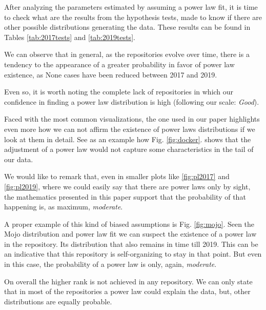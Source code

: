 \documentclass{article}
\begin{document}
After analyzing the parameters estimated by assuming a power law fit,
it is time to check what are 
the results from the hypothesis tests, made to know if there are other
possible distributions generating the data. These results can be found
in Tables \ref{tab:2017tests} and \ref{tab:2019tests}.

We can observe that in general, as the repositories evolve over time,
there is a tendency to the appearance of a greater probability in
favor of power law existence, as None cases have been reduced between
2017 and 2019.

Even so, it is worth noting the complete lack of repositories in which
our confidence in finding a power law distribution is high (following
our scale: \textit{Good}).

Faced with the most common visualizations, the one used in our paper
highlights even more how we can not affirm the existence of power laws
distributions if we look at them in detail. See as an example how
Fig. \ref{fig:docker}. shows that the adjustment of a power law would
not capture some characteristics in the tail of our data.

We would like to remark that, even in smaller plots like
\ref{fig:pl2017} and \ref{fig:pl2019}, where we could easily say that
there are power laws only by sight, the mathematics presented in this
paper support that the probability of that happening is, as maximum,
\textit{ moderate}.

A proper example of this kind of biased assumptions is
Fig. \ref{fig:mojo}. Seen the Mojo distribution and power law fit we
can suspect the existence of a power law in the repository. Its
distribution that also remains in time till 2019. This can be an
indicative that this repository is self-organizing to stay in that
point. But even in this case, the probability of a power law is only,
again, \textit{moderate}.

On overall the higher rank is not achieved in any repository. We can only 
state that in most of the repositories a power law could explain the data, 
but, other distributions are equally probable.
\end{document}
